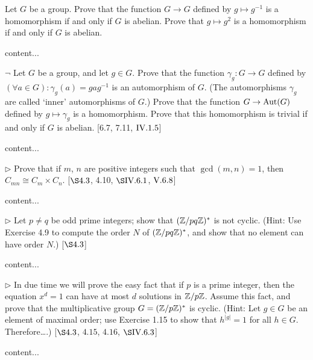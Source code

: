 \begin{exercise}
	Let $G$ be a group. Prove that the function $G\to G$ defined by $g\mapsto g^{-1}$ is a homomorphism if and only if $G$ is abelian. Prove that $g\mapsto g^2$ is a homomorphism if and only if $G$ is abelian.
\end{exercise}
\begin{solution}
	content...
\end{solution}

\begin{exercise}
	$\neg$ Let $G$ be a group, and let $g\in G$. Prove that the function $\gamma_g\colon G \to G$ defined by $(\forall a\in G): \gamma_g(a)=gag^{-1}$ is an automorphism of $G$. (The automorphisms $\gamma_g$ are called `inner' automorphisms of $G$.) Prove that the function $G \to \operatorname{Aut}(G)$ defined by $g\mapsto \gamma_g$ is a homomorphism. Prove that this homomorphism is trivial if and only if $G$ is abelian. [6.7, 7.11, $\RNo{4}.1.5$]
\end{exercise}
\begin{solution}
	content...
\end{solution}

\begin{exercise}
	$\triangleright$ Prove that if $m$, $n$ are positive integers such that $\gcd(m,n) = 1$, then $C_{mn} \cong C_m \times C_n$. [$\S 4.3$, 4.10, $\S\RNo{4}.6.1$, $\RNo{5}.6.8$]
\end{exercise}
\begin{solution}
	content...
\end{solution}

\begin{exercise}
	$\triangleright$ Let $p\neq q$ be odd prime integers; show that $(\mathbb{Z}/pq\mathbb{Z})^{\ast}$ is not cyclic. (Hint: Use Exercise 4.9 to compute the order $N$ of $(\mathbb{Z}/pq\mathbb{Z})^{\ast}$, and show that no element can have order $N$.) [$\S 4.3$]
\end{exercise}
\begin{solution}
	content...
\end{solution}

\begin{exercise}
	$\triangleright$ In due time we will prove the easy fact that if $p$ is a prime integer, then the equation $x^d = 1$ can have at most $d$ solutions in $\mathbb{Z}/p\mathbb{Z}$. Assume this fact, and prove that the multiplicative group $G = (\mathbb{Z}/p\mathbb{Z})^*$ is cyclic. (Hint: Let $g\in G$ be an element of maximal order; use Exercise 1.15 to show that $h^{|g|} = 1$ for all $h\in G$. Therefore\ldots .) [$\S4.3$, $4.15$, $4.16$, $\S\RNo{4}.6.3$]
\end{exercise}
\begin{solution}
	content...
\end{solution}

